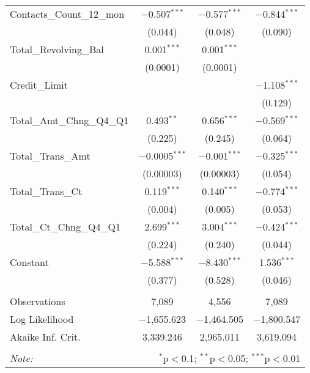 \begin{table}[!htbp]
\begin{tabular}{@{\extracolsep{5pt}}lccc}
  Contacts\_Count\_12\_mon & $-$0.507$^{***}$ & $-$0.577$^{***}$ & $-$0.844$^{***}$ \\ 
  & (0.044) & (0.048) & (0.090) \\ 
  Total\_Revolving\_Bal & 0.001$^{***}$ & 0.001$^{***}$ &  \\ 
  & (0.0001) & (0.0001) &  \\ 
  Credit\_Limit &  &  & $-$1.108$^{***}$ \\ 
  &  &  & (0.129) \\ 
  Total\_Amt\_Chng\_Q4\_Q1 & 0.493$^{**}$ & 0.656$^{***}$ & $-$0.569$^{***}$ \\ 
  & (0.225) & (0.245) & (0.064) \\ 
  Total\_Trans\_Amt & $-$0.0005$^{***}$ & $-$0.001$^{***}$ & $-$0.325$^{***}$ \\ 
  & (0.00003) & (0.00003) & (0.054) \\ 
  Total\_Trans\_Ct & 0.119$^{***}$ & 0.140$^{***}$ & $-$0.774$^{***}$ \\ 
  & (0.004) & (0.005) & (0.053) \\ 
  Total\_Ct\_Chng\_Q4\_Q1 & 2.699$^{***}$ & 3.004$^{***}$ & $-$0.424$^{***}$ \\ 
  & (0.224) & (0.240) & (0.044) \\ 
  Constant & $-$5.588$^{***}$ & $-$8.430$^{***}$ & 1.536$^{***}$ \\ 
  & (0.377) & (0.528) & (0.046) \\ 
 \hline \\[-1.8ex] 
Observations & 7,089 & 4,556 & 7,089 \\ 
Log Likelihood & $-$1,655.623 & $-$1,464.505 & $-$1,800.547 \\ 
Akaike Inf. Crit. & 3,339.246 & 2,965.011 & 3,619.094 \\ 
\hline 
\hline \\[-1.8ex] 
\textit{Note:}  & \multicolumn{3}{r}{$^{*}$p$<$0.1; $^{**}$p$<$0.05; $^{***}$p$<$0.01} \\ 
\end{tabular} 
\end{table}

